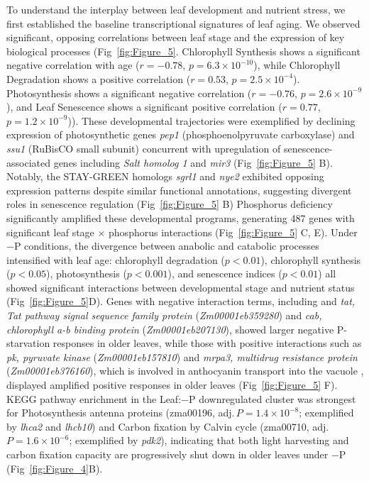 \documentclass[9pt,twocolumn,twoside]{rilabRxiv}
\begin{document}
To understand the interplay between leaf development and nutrient stress, we first established the baseline transcriptional signatures of leaf aging.
We observed significant, opposing correlations between leaf stage and the expression of key biological processes (Fig~\ref{fig:Figure_5}.
Chlorophyll Synthesis shows a significant negative correlation with age
($r = -0.78$, $p = 6.3\times 10^{-10}$), while Chlorophyll Degradation shows a positive correlation ($r = 0.53$, $p = 2.5\times 10^{-4}$). 
Photosynthesis shows a significant negative correlation ($r = -0.76$, $p = 2.6\times 10^{-9}$), and Leaf Senescence shows a significant positive correlation ($r = 0.77$, $p = 1.2\times 10^{-9}$)). 
These developmental trajectories were exemplified by declining expression of photosynthetic genes \textit{pep1} (phosphoenolpyruvate carboxylase) and \textit{ssu1} (RuBisCO small subunit) concurrent with upregulation of senescence-associated genes including \textit{Salt homolog 1} and \textit{mir3} (Fig~\ref{fig:Figure_5} B). 
Notably, the STAY-GREEN homologs \textit{sgrl1} and \textit{nye2} exhibited opposing expression patterns despite similar functional annotations, suggesting divergent roles in senescence regulation (Fig~\ref{fig:Figure_5} B) Phosphorus deficiency significantly amplified these developmental programs, generating 487 genes with significant leaf stage $\times$ phosphorus interactions (Fig~\ref{fig:Figure_5} C, E).
Under $-$P conditions, the divergence between anabolic and catabolic processes intensified with leaf age: chlorophyll degradation ($p < 0.01$), chlorophyll synthesis ($p < 0.05$), photosynthesis ($p < 0.001$), and senescence indices ($p < 0.01$) all showed significant interactions between developmental stage and nutrient status (Fig~\ref{fig:Figure_5}D).
Genes with negative interaction terms, including and \textit{tat, Tat pathway signal sequence family protein} (\textit{Zm00001eb359280}) and \textit{cab, chlorophyll a-b binding protein} (\textit{Zm00001eb207130}), showed larger negative P-starvation responses in older leaves, while those with positive interactions such as \textit{pk, pyruvate kinase} (\textit{Zm00001eb157810}) and \textit{mrpa3, multidrug resistance protein} (\textit{Zm00001eb376160}), which is involved in anthocyanin transport into the vacuole \cite{goodman2004},  displayed amplified positive responses in older leaves (Fig~\ref{fig:Figure_5} F). 
KEGG pathway enrichment in the Leaf:$-$P downregulated cluster was strongest for Photosynthesis antenna proteins (zma00196, adj.\,$P = 1.4\times 10^{-8}$; exemplified by \textit{lhca2} and \textit{lhcb10}) and Carbon fixation by Calvin cycle (zma00710, adj.\,$P = 1.6\times 10^{-6}$; exemplified by \textit{pdk2}), indicating that both light harvesting and carbon fixation capacity are progressively shut down in older leaves under $-$P (Fig~\ref{fig:Figure_4}B).
\end{document}
